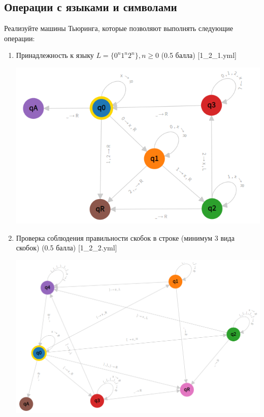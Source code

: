 \documentclass[a4paper,12pt]{article}
\begin{document}
\subsection{Операции с языками и символами}

Реализуйте машины Тьюринга, которые позволяют выполнять следующие операции:
\begin{enumerate}
    \item Принадлежность к языку $L = \{ 0^n1^n2^n \}, n \ge 0$ (0.5 балла) [1\_2\_1.yml]
    
    \begin{center}
        \includegraphics[scale=0.6]{img/1_2_1.png}
    \end{center}
    
    \item Проверка соблюдения правильности скобок в строке (минимум 3 вида скобок) (0.5 балла) [1\_2\_2.yml]
    
    \begin{center}
        \includegraphics[scale=0.8]{img/1_2_2.png}
    \end{center}
    

\end{enumerate}
\end{document}
